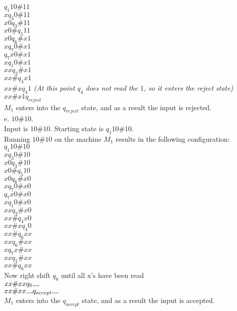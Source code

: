 \documentclass[12pt]{article}
\newcommand\Vtextvisiblespace[1][.8em]{%
	\mbox{\kern.07em\vrule height.3ex}%
	\vbox{\hrule width#1}%
	\hbox{\vrule height.3ex}}
\begin{document}
$        q_1 10 \# 11  $ \\
$x       q_3 0 \# 11   $ \\
$x0      q_3 \# 11     $ \\
$x0 \#   q_5 11        $ \\
$x0      q_6 \# x 1    $ \\
$x       q_7 0 \# x 1    $ \\
$        q_7 x 0 \# x 1  $ \\
$x       q_1 0 \# x 1    $ \\
$xx      q_2 \# x 1      $ \\
$xx \#   q_4 x 1         $ \\
$xx \# x q_4 1 $ \textit{(At this point $q_4$ does not read the $1$, so it enters the reject state)} \\
$xx \# x 1 q_{reject}    $ \\
$M_1$ enters into the $q_{reject}$ state, and as a result the input is rejected. \\

\pagebreak
e. $10\#10$. \\

Input is $10\#10$. Starting state is $q_1 10\#10$. \\
Running $10\#10$ on the machine $M_1$ results in the following configuration: \\

$            q_1 10 \# 10   $ \\
$x           q_3 0  \# 10   $ \\
$x0          q_3    \# 10   $ \\
$x0 \#       q_5       10   $ \\
$x0          q_6    \# x0   $ \\
$x           q_7  0 \# x0   $ \\
$            q_7 x0 \# x0   $ \\
$x           q_1  0 \# x0   $ \\
$xx          q_2    \# x0   $ \\
$xx \#       q_4       x0   $ \\
$xx \# x     q_4        0   $ \\
$xx \#       q_6       xx   $ \\
$xx          q_6    \# xx   $ \\
$x           q_7  x \# xx   $ \\
$xx          q_1    \# xx   $ \\
$xx \#       q_8       xx   $ \\
Now right shift $q_8$ until all x's have been read \\
$xx \# xx    q_8  \Vtextvisiblespace   $ \\
$xx \# xx         \Vtextvisiblespace q_{accept} \Vtextvisiblespace $ \\
$M_1$ enters into the $q_{accept}$ state, and as a result the input is accepted. \\
\end{document}
